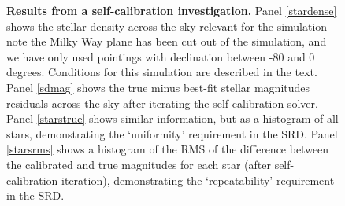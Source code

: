 \documentclass[12pt,preprint]{aastex}
\begin{document}
\begin{figure}
\caption{{\small
{\bf Results from a self-calibration investigation.} Panel \ref{stardense} shows
the stellar density across the sky relevant for the simulation - note
the Milky Way plane has been cut out of the simulation, and we have
only used pointings with declination between -80 and 0 degrees.
Conditions for this simulation are described in the text.  Panel \ref{sdmag}
shows the true minus best-fit stellar magnitudes residuals across the
sky after iterating the self-calibration solver. Panel \ref{starstrue} shows
similar information, but as a histogram of all stars, demonstrating
the `uniformity'  requirement in the SRD. Panel \ref{starsrms} shows
a histogram of the RMS of the difference between the calibrated and
true magnitudes for each star (after self-calibration iteration),
demonstrating the `repeatability' requirement in the SRD. 
}}
\label{fig:selfcal_fiducial}
\end{figure}
\end{document}
